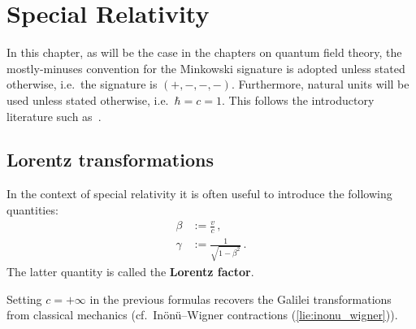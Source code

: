 \chapter{Special Relativity}

    In this chapter, as will be the case in the chapters on quantum field theory, the mostly-minuses convention for the Minkowski signature is adopted unless stated otherwise, i.e.~the signature is $(+,-,-,-)$. Furthermore, natural units will be used unless stated otherwise, i.e.~$\hbar = c = 1$. This follows the introductory literature such as~\citet{greiner_field_1996,peskin_introduction_1995}.

\section{Lorentz transformations}

    \begin{notation}
        In the context of special relativity it is often useful to introduce the following quantities:
        \begin{align}
            \beta &:= \frac{v}{c}\,,\\
            \label{relativity:lorentz_factor}
            \gamma &:= \frac{1}{\sqrt{1 - \beta^2}}\,.
        \end{align}
        The latter quantity is called the \textbf{Lorentz factor}.
    \end{notation}
    \begin{remark}
        Setting $c=+\infty$ in the previous formulas recovers the Galilei transformations from classical mechanics (cf.~In\"on\"u--Wigner contractions (\cref{lie:inonu_wigner})).
    \end{remark}

